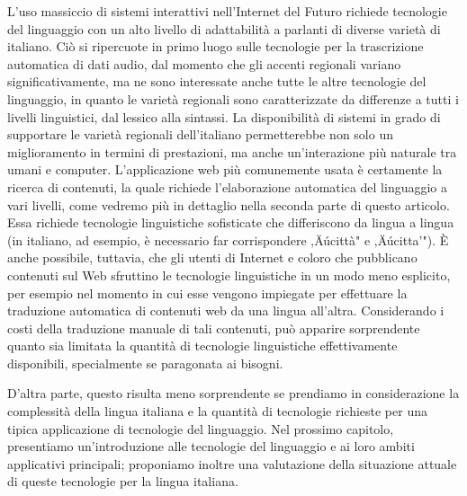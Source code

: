 \begin{multicols}{2}
L'uso massiccio di sistemi interattivi nell'Internet del Futuro richiede
tecnologie del linguaggio con un alto livello di adattabilit\`{a} a parlanti
di diverse variet\`{a} di italiano. Ci\`{o} si ripercuote in primo luogo sulle
tecnologie per la trascrizione automatica di dati audio, dal momento che gli
accenti regionali variano significativamente, ma ne sono interessate anche
tutte le altre tecnologie del linguaggio, in quanto le variet\`{a} regionali
sono caratterizzate da differenze a tutti i livelli linguistici, dal lessico
alla sintassi. La disponibilit\`{a} di sistemi in grado di supportare le
variet\`{a} regionali dell'italiano permetterebbe non solo un miglioramento in
termini di prestazioni, ma anche un'interazione pi\`{u} naturale tra umani e
computer.
L'applicazione web pi\`{u} comunemente usata \`{e} certamente la ricerca di
contenuti, la quale richiede l'elaborazione automatica del linguaggio a vari
livelli, come vedremo pi\`{u} in dettaglio nella seconda parte di questo
articolo. Essa richiede tecnologie linguistiche sofisticate che differiscono
da lingua a lingua (in italiano, ad esempio, \`{e} necessario far
corrispondere ‚Äúcitt\`{a}" e ‚Äúcitta'"). \`{E} anche possibile, tuttavia, che
gli utenti di Internet e coloro che pubblicano contenuti sul Web sfruttino le
tecnologie linguistiche in un modo meno esplicito, per esempio nel momento in
cui esse vengono impiegate per effettuare la traduzione automatica di
contenuti web da una lingua all'altra. Considerando i costi della traduzione
manuale di tali contenuti, pu\`{o} apparire sorprendente quanto sia limitata
la quantit\`{a} di tecnologie linguistiche effettivamente disponibili,
specialmente se paragonata ai bisogni.

D'altra parte, questo risulta meno sorprendente se prendiamo in considerazione
la complessit\`{a} della lingua italiana e la quantit\`{a} di tecnologie
richieste per una tipica applicazione di tecnologie del linguaggio. Nel
prossimo capitolo, presentiamo un'introduzione alle tecnologie del linguaggio
e ai loro ambiti applicativi principali; proponiamo inoltre una valutazione
della situazione attuale di queste tecnologie per la lingua
italiana.



\end{multicols}

\clearpage





